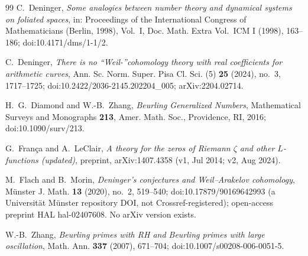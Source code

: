 \documentclass[11pt]{article}
\theoremstyle{plain}
\theoremstyle{definition}
\theoremstyle{remark}
\begin{document}
\begin{thebibliography}{99}
C.~Deninger,
\emph{Some analogies between number theory and dynamical systems on foliated
spaces},
in: Proceedings of the International Congress of Mathematicians (Berlin, 1998),
Vol.~I, Doc. Math. Extra Vol.\ ICM I (1998), 163--186;
doi:10.4171/dms/1-1/2.

C.~Deninger,
\emph{There is no ``Weil-''cohomology theory with real coefficients for
arithmetic curves},
Ann. Sc. Norm. Super. Pisa Cl. Sci. (5) \textbf{25} (2024), no.~3, 1717--1725;
doi:10.2422/2036-2145.202204\_005;
arXiv:2204.02714.

H.~G.~Diamond and W.-B.~Zhang,
\emph{Beurling Generalized Numbers},
Mathematical Surveys and Monographs \textbf{213},
Amer. Math. Soc., Providence, RI, 2016;
doi:10.1090/surv/213.

G.~Fran\c{c}a and A.~LeClair,
\emph{A theory for the zeros of Riemann $\zeta$ and other $L$-functions
(updated)},
preprint, arXiv:1407.4358 (v1, Jul 2014; v2, Aug 2024).

M.~Flach and B.~Morin,
\emph{Deninger's conjectures and Weil--Arakelov cohomology},
M\"unster J. Math. \textbf{13} (2020), no.~2, 519--540;
doi:10.17879/90169642993 (a Universit\"at M\"unster repository DOI, not
Crossref-registered); open-access preprint HAL hal-02407608. No arXiv version
exists.

W.-B.~Zhang,
\emph{Beurling primes with RH and Beurling primes with large oscillation},
Math. Ann. \textbf{337} (2007), 671--704;
doi:10.1007/s00208-006-0051-5.

\end{thebibliography}
\end{document}
